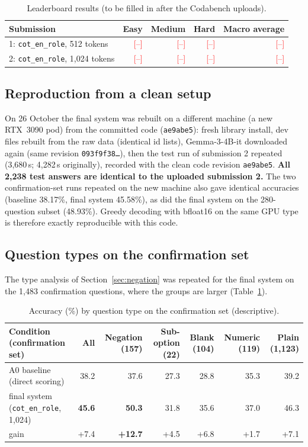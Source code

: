 \documentclass[10pt,a4paper]{article}
\newcommand{\cond}[1]{\texttt{#1}}
\newcommand{\todo}[1]{\textcolor{red}{[#1]}}
\begin{document}
\begin{table}[h]
\centering\small
\begin{tabular}{lrrrr}
\toprule
Submission & Easy & Medium & Hard & Macro average\\
\midrule
1: \cond{cot\_en\_role}, 512 tokens & \todo{--} & \todo{--} & \todo{--} & \todo{--}\\
2: \cond{cot\_en\_role}, 1,024 tokens & \todo{--} & \todo{--} & \todo{--} & \todo{--}\\
\bottomrule
\end{tabular}
\caption{Leaderboard results (to be filled in after the Codabench uploads).}
\end{table}

\subsection{Reproduction from a clean setup}\label{sec:reproduction}
On 26 October the final system was rebuilt on a different machine (a new RTX~3090 pod) from the committed code
(\texttt{ae9abe5}): fresh library install, dev files rebuilt from the raw data (identical id lists), Gemma-3-4B-it
downloaded again (same revision \texttt{093f9f38\ldots}), then the test run of submission 2 repeated (3,680\,s; 4,282\,s
originally), recorded with the clean code revision \texttt{ae9abe5}.
\textbf{All 2,238 test answers are identical to the uploaded submission 2.} The two confirmation-set runs repeated on
the new machine also gave identical accuracies (baseline 38.17\%, final system 45.58\%), as did the final system on
the 280-question subset (48.93\%). Greedy decoding with bfloat16 on the same GPU type is therefore exactly
reproducible with this code.

\subsection{Question types on the confirmation set}
The type analysis of Section~\ref{sec:negation} was repeated for the final system on the 1,483 confirmation questions,
where the groups are larger (Table~\ref{tab:qtypes_rest}).

\begin{table}[h]
\centering\footnotesize\setlength{\tabcolsep}{4pt}
\begin{tabular}{lrrrrrr}
\toprule
Condition (confirmation set) & All & Negation (157) & Sub-option (22) & Blank (104) & Numeric (119) & Plain (1,123)\\
\midrule
A0 baseline (direct scoring) & 38.2 & 37.6 & 27.3 & 28.8 & 35.3 & 39.2\\
final system (\cond{cot\_en\_role}, 1,024) & \textbf{45.6} & \textbf{50.3} & 31.8 & 35.6 & 37.0 & 46.3\\
gain & +7.4 & \textbf{+12.7} & +4.5 & +6.8 & +1.7 & +7.1\\
\bottomrule
\end{tabular}
\caption{Accuracy (\%) by question type on the confirmation set (descriptive).}
\label{tab:qtypes_rest}
\end{table}
\end{document}
